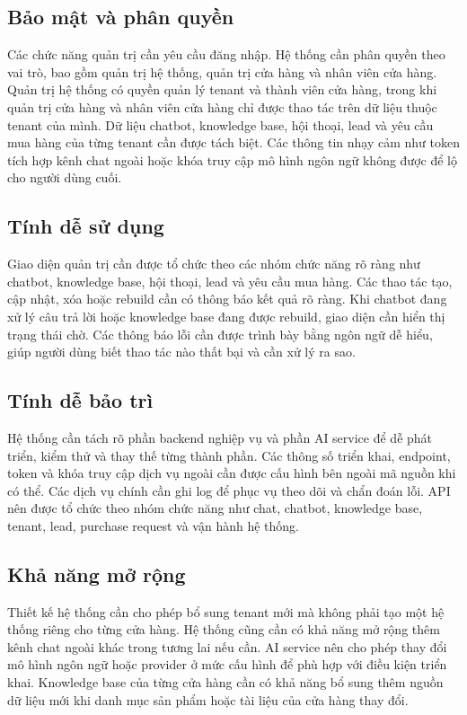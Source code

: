 \documentclass[../DoAn.tex]{subfiles}
\begin{document}
\subsection{Bảo mật và phân quyền}

Các chức năng quản trị cần yêu cầu đăng nhập. Hệ thống cần phân quyền theo vai trò, bao gồm quản trị hệ thống, quản trị cửa hàng và nhân viên cửa hàng. Quản trị hệ thống có quyền quản lý tenant và thành viên cửa hàng, trong khi quản trị cửa hàng và nhân viên cửa hàng chỉ được thao tác trên dữ liệu thuộc tenant của mình. Dữ liệu chatbot, knowledge base, hội thoại, lead và yêu cầu mua hàng của từng tenant cần được tách biệt. Các thông tin nhạy cảm như token tích hợp kênh chat ngoài hoặc khóa truy cập mô hình ngôn ngữ không được để lộ cho người dùng cuối.

\subsection{Tính dễ sử dụng}

Giao diện quản trị cần được tổ chức theo các nhóm chức năng rõ ràng như chatbot, knowledge base, hội thoại, lead và yêu cầu mua hàng. Các thao tác tạo, cập nhật, xóa hoặc rebuild cần có thông báo kết quả rõ ràng. Khi chatbot đang xử lý câu trả lời hoặc knowledge base đang được rebuild, giao diện cần hiển thị trạng thái chờ. Các thông báo lỗi cần được trình bày bằng ngôn ngữ dễ hiểu, giúp người dùng biết thao tác nào thất bại và cần xử lý ra sao.

\subsection{Tính dễ bảo trì}

Hệ thống cần tách rõ phần backend nghiệp vụ và phần AI service để dễ phát triển, kiểm thử và thay thế từng thành phần. Các thông số triển khai, endpoint, token và khóa truy cập dịch vụ ngoài cần được cấu hình bên ngoài mã nguồn khi có thể. Các dịch vụ chính cần ghi log để phục vụ theo dõi và chẩn đoán lỗi. API nên được tổ chức theo nhóm chức năng như chat, chatbot, knowledge base, tenant, lead, purchase request và vận hành hệ thống.

\subsection{Khả năng mở rộng}

Thiết kế hệ thống cần cho phép bổ sung tenant mới mà không phải tạo một hệ thống riêng cho từng cửa hàng. Hệ thống cũng cần có khả năng mở rộng thêm kênh chat ngoài khác trong tương lai nếu cần. AI service nên cho phép thay đổi mô hình ngôn ngữ hoặc provider ở mức cấu hình để phù hợp với điều kiện triển khai. Knowledge base của từng cửa hàng cần có khả năng bổ sung thêm nguồn dữ liệu mới khi danh mục sản phẩm hoặc tài liệu của cửa hàng thay đổi.
\end{document}
